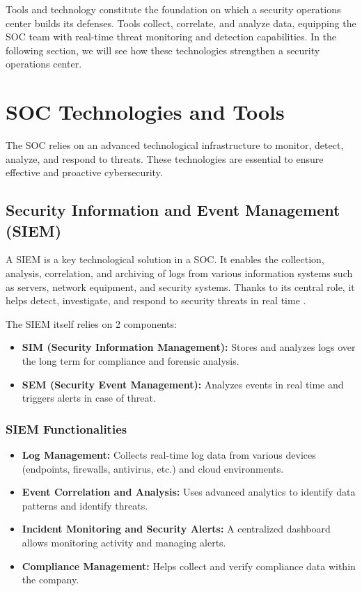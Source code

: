 Tools and technology constitute the foundation on which a security operations center builds its defenses. Tools collect, correlate, and analyze data, equipping the SOC team with real-time threat monitoring and detection capabilities. In the following section, we will see how these technologies strengthen a security operations center.

\section{SOC Technologies and Tools}
\label{sec:technologies}

The SOC relies on an advanced technological infrastructure to monitor, detect, analyze, and respond to threats. These technologies are essential to ensure effective and proactive cybersecurity.

\subsection{Security Information and Event Management (SIEM)}
\label{subsec:siem}

A SIEM is a key technological solution in a SOC. It enables the collection, analysis, correlation, and archiving of logs from various information systems such as servers, network equipment, and security systems. Thanks to its central role, it helps detect, investigate, and respond to security threats in real time \cite{ref35} \cite{ref36}.

The SIEM itself relies on 2 components:

\begin{itemize}
    \item \textbf{SIM (Security Information Management):} Stores and analyzes logs over the long term for compliance and forensic analysis.
    \item \textbf{SEM (Security Event Management):} Analyzes events in real time and triggers alerts in case of threat.
\end{itemize}

\subsubsection{SIEM Functionalities}

\begin{itemize}
    \item \textbf{Log Management:} Collects real-time log data from various devices (endpoints, firewalls, antivirus, etc.) and cloud environments.
    \item \textbf{Event Correlation and Analysis:} Uses advanced analytics to identify data patterns and identify threats.
    \item \textbf{Incident Monitoring and Security Alerts:} A centralized dashboard allows monitoring activity and managing alerts.
    \item \textbf{Compliance Management:} Helps collect and verify compliance data within the company.
\end{itemize}

